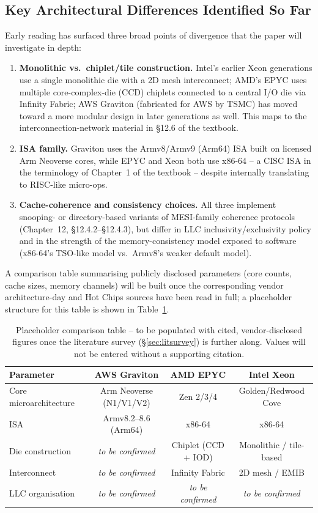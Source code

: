 \documentclass[11pt,a4paper]{article}
\begin{document}
\subsection{Key Architectural Differences Identified So Far}
Early reading has surfaced three broad points of divergence that the paper will investigate
in depth:
\begin{enumerate}[nosep]
  \item \textbf{Monolithic vs.\ chiplet/tile construction.} Intel's earlier Xeon
        generations use a single monolithic die with a 2D mesh interconnect; AMD's EPYC uses
        multiple core-complex-die (CCD) chiplets connected to a central I/O die via
        Infinity Fabric; AWS Graviton (fabricated for AWS by TSMC) has moved toward a more
        modular design in later generations as well. This maps to the interconnection-network
        material in \S12.6 of the textbook.
  \item \textbf{ISA family.} Graviton uses the Armv8/Armv9 (Arm64) ISA built on licensed
        Arm Neoverse cores, while EPYC and Xeon both use x86-64 -- a CISC ISA in the
        terminology of Chapter~1 of the textbook -- despite internally translating to
        RISC-like micro-ops.
  \item \textbf{Cache-coherence and consistency choices.} All three implement snooping- or
        directory-based variants of MESI-family coherence protocols (Chapter~12,
        \S12.4.2--\S12.4.3), but differ in LLC inclusivity/exclusivity policy and in the
        strength of the memory-consistency model exposed to software (x86-64's TSO-like
        model vs.\ Armv8's weaker default model).
\end{enumerate}
A comparison table summarising publicly disclosed parameters (core counts, cache sizes,
memory channels) will be built once the corresponding vendor architecture-day and Hot Chips
sources have been read in full; a placeholder structure for this table is shown in
Table~\ref{tab:comparison-placeholder}.

\begin{table}[h]
\centering
\small
\begin{tabular}{@{}lccc@{}}
\toprule
\textbf{Parameter} & \textbf{AWS Graviton} & \textbf{AMD EPYC} & \textbf{Intel Xeon} \\
\midrule
Core microarchitecture & Arm Neoverse (N1/V1/V2) & Zen 2/3/4 & Golden/Redwood Cove \\
ISA & Armv8.2--8.6 (Arm64) & x86-64 & x86-64 \\
Die construction & \emph{to be confirmed} & Chiplet (CCD + IOD) & Monolithic / tile-based \\
Interconnect & \emph{to be confirmed} & Infinity Fabric & 2D mesh / EMIB \\
LLC organisation & \emph{to be confirmed} & \emph{to be confirmed} & \emph{to be confirmed} \\
\bottomrule
\end{tabular}
\caption{Placeholder comparison table -- to be populated with cited, vendor-disclosed figures
once the literature survey (\S\ref{sec:litsurvey}) is further along. Values will not be
entered without a supporting citation.}
\label{tab:comparison-placeholder}
\end{table}
\end{document}
